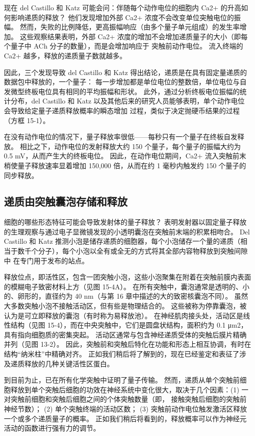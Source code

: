现在 del Castillo 和 Katz 可能会问：伴随每个动作电位的细胞内 Ca2+ 的升高如何影响递质的释放？ 他们发现增加外部 Ca2+ 浓度不会改变单位突触电位的振幅。 然而，失败的比例降低，更高振幅响应（由多个量子单元组成）的发生率增加。 这些观察结果表明，外部 Ca2+ 浓度的增加不会增加递质量子的大小（即每个量子中 ACh 分子的数量），而是会增加响应于 突触前动作电位。 流入终端的 Ca2+ 越多，释放的递质量子数就越多。

因此，三个发现导致 del Castillo 和 Katz 得出结论，递质是在具有固定量递质的数据包中释放的，一个量子： 每一步增加都是单位电位的整数倍，单位电位与自发微型终板电位具有相同的平均振幅和形状。 此外，通过分析终板电位振幅的统计分布，del Castillo 和 Katz 以及其他后来的研究人员能够表明，单个动作电位会导致给定量子递质释放概率的瞬态增加 过程，类似于决定抛硬币结果的过程（方框 15-1）。

在没有动作电位的情况下，量子释放率很低——每秒只有一个量子在终板自发释放。 相比之下，动作电位的发射释放大约 150 个量子，每个量子的振幅大约为 0.5 mV，从而产生大的终板电位。 因此，在动作电位期间，Ca2+ 流入突触前末梢使量子释放速率显着增加 150,000 倍，从而在约 1 毫秒内触发约 150 个量子的同步释放。


\subsection{递质由突触囊泡存储和释放}
细胞的哪些形态特征可能会导致发射体的量子释放？ 表明发射器以固定量子释放的生理观察与通过电子显微镜发现的小透明囊泡在突触前末端的积累相吻合。 Del Castillo 和 Katz 推测小泡是储存递质的细胞器，每个小泡储存一个量的递质（相当于数千个分子），每个小泡以全有或全无的方式将其全部内容物释放到突触间隙中 在专门用于发布的站点。

释放位点，即活性区，包含一团突触小泡，这些小泡聚集在附着在突触前膜内表面的模糊电子致密材料上方（见图 15-4A）。 在所有突触中，囊泡通常是透明的、小的、卵形的，直径约为 40 nm（与第 16 章中描述的大的致密核囊泡不同）。 虽然大多数突触小泡不接触活动区，但有些是物理结合的。 这些被称为停靠囊泡，被认为是可立即释放的囊泡（有时称为易释放池）。 在神经肌肉接头处，活动区是线性结构（见图 15-4），而在中央突触中，它们是圆盘状结构，面积约为 0.1 μm2，具有指向细胞质的密集突起。 活动区通常与包含神经递质受体的突触后膜片精确并列（见图 13-2）。 因此，突触前和突触后特化在功能和形态上相互协调，有时在结构“纳米柱”中精确对齐。 正如我们稍后将了解到的，现在已经鉴定和表征了涉及递质释放的几种关键活性区蛋白。

到目前为止，已在所有化学突触中证明了量子传输。 然而，递质从单个突触前细胞释放到单个突触后细胞的功效在神经系统中变化很大，取决于几个因素：(1) 一对突触前细胞和突触后细胞之间的个体突触数量（即， 接触突触后细胞的突触前神经节数）； (2) 单个突触终端的活动区数； (3) 突触前动作电位触发激活区释放一个或多个递质量子的概率。 正如我们稍后将看到的，释放概率可以作为神经元活动的函数进行强有力的调节。

